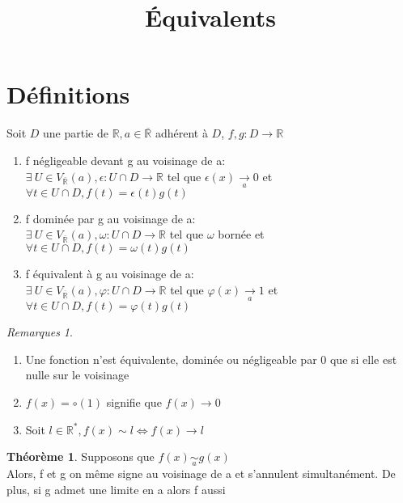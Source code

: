 \documentclass[fleqn]{article}
\title{\'Equivalents}
\date{}
\theoremstyle{definition} \newtheorem*{defi}{D\'efinition}
\theoremstyle{definition} \newtheorem*{theo}{Th\'eor\`eme}
\theoremstyle{remark} \newtheorem*{rqs}{Remarques}
\begin{document}
\maketitle

\section{D\'efinitions}
Soit $D$ une partie de $\mathbb{R}, a \in \overline{\mathbb{R}}$ adh\'erent \`a $D$, $f,g: D \rightarrow \mathbb{R}$
\begin{enumerate}
	\item f n\'egligeable devant g au voisinage de a: \\
		$\exists\ U \in V_{\overline{\mathbb{R}}}(a), \epsilon: U \cap D \rightarrow \mathbb{R}$ tel que
		$\epsilon(x)\underset{a}{\rightarrow}  0$ et $\forall t \in U \cap D, f(t)=\epsilon(t)g(t)$
	\item f domin\'ee par g au voisinage de a: \\
		$\exists\ U \in V_{\overline{\mathbb{R}}}(a), \omega: U \cap D \rightarrow \mathbb{R}$ tel que $\omega$ born\'ee et
		$\forall t \in U \cap D, f(t)=\omega(t)g(t)$
	\item f \'equivalent \`a g au voisinage de a: \\
		$\exists\ U \in V_{\overline{\mathbb{R}}}(a), \varphi: U \cap D \rightarrow \mathbb{R}$ tel que $\varphi(x)\underset{a}{\rightarrow} 1$
		et $\forall t \in U \cap D, f(t)=\varphi(t)g(t)$
\end{enumerate}

\begin{rqs} $ $
	\begin{enumerate}
		\item Une fonction n'est \'equivalente, domin\'ee ou n\'egligeable par 0 que si elle est nulle sur le voisinage
		\item $f(x) = \circ(1)$ signifie que $f(x) \rightarrow 0$
		\item Soit $l \in \mathbb{R}^{*}, f(x) \sim l \Leftrightarrow f(x) \rightarrow l$
	\end{enumerate}
\end{rqs}

\begin{theo}
	Supposons que $f(x)\underset{a}{\sim} g(x)$\\
	Alors, f et g on m\^eme signe au voisinage de a et s'annulent simultan\'ement. De plus, si g admet une limite en a alors f aussi
\end{theo}
\end{document}
